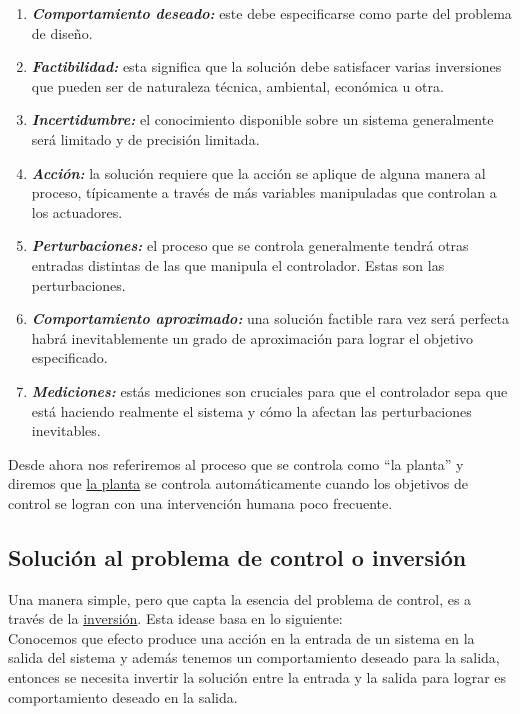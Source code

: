 \documentclass[a4paper]{article}
\begin{document}
\begin{enumerate}
		\item \textbf{\textit{Comportamiento deseado:}} este debe especificarse como parte del problema de diseño.
		\item \textbf{\textit{Factibilidad:}} esta significa que la solución debe satisfacer varias inversiones que pueden ser de naturaleza técnica, ambiental, económica u otra.
		\item \textbf{\textit{Incertidumbre:}} el conocimiento disponible sobre un sistema generalmente será limitado y de precisión limitada.
		\item \textbf{\textit{Acción:}} la solución requiere que la acción se aplique de alguna  manera al proceso, típicamente a través de más variables manipuladas que controlan a los actuadores.
		\item \textbf{\textit{Perturbaciones:}} el proceso que se controla generalmente tendrá otras entradas distintas de las que manipula el controlador. Estas son las perturbaciones.
		\item \textbf{\textit{Comportamiento aproximado:}} una solución factible rara vez será perfecta habrá inevitablemente un grado de aproximación para lograr el objetivo especificado.
		\item \textbf{\textit{Mediciones:}} estás mediciones son cruciales para que el controlador sepa que está haciendo realmente el sistema y cómo la afectan las perturbaciones inevitables.
\end{enumerate}

Desde ahora nos referiremos al proceso que se controla como ``la planta'' y diremos que \underline{la planta} se controla automáticamente cuando los objetivos de control se logran con una intervención humana poco frecuente.

\subsection{Solución al problema de control o inversión}

Una manera simple, pero que capta la esencia del problema de control, es a través de la \underline{inversión}. Esta idease basa en lo siguiente: \\
Conocemos que efecto produce una acción en la entrada de un sistema en la salida del sistema y además tenemos un comportamiento deseado para la salida, entonces se necesita invertir la solución entre la entrada y la salida para lograr es comportamiento deseado en la salida.
\end{document}
